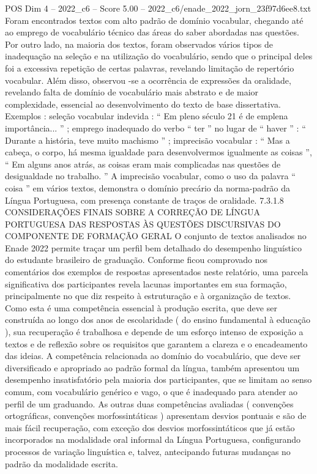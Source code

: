\begin{textsample}{POS Dim 4 – 2022\_c6 – Score 5.00 – 2022\_c6/enade\_2022\_jorn\_23f97d6ee8.txt}
Foram encontrados textos com alto padrão de domínio vocabular, chegando até ao emprego de vocabulário técnico das áreas do saber abordadas nas questões.
Por outro lado, na maioria dos textos, foram observados vários tipos de inadequação na seleção e na utilização do vocabulário, sendo que o principal deles foi a excessiva repetição de certas palavras, revelando limitação de repertório vocabular.
Além disso, observou -se a ocorrência de expressões da oralidade, revelando falta de domínio de vocabulário mais abstrato e de maior complexidade, essencial ao desenvolvimento do texto de base dissertativa.
Exemplos : seleção vocabular indevida : “ Em pleno século 21 é de emplena importância... ” ; emprego inadequado do verbo “ ter ” no lugar de “ haver ” : “ Durante a história, teve muito machismo ” ; imprecisão vocabular : “ Mas a cabeça, o corpo, há mesma igualdade para desenvolvermos igualmente as coisas ”, “ Em alguns anos atrás, as coisas eram mais complicadas nas questões de desigualdade no trabalho. ” A imprecisão vocabular, como o uso da palavra “ coisa ” em vários textos, demonstra o domínio precário da norma-padrão da Língua Portuguesa, com presença constante de traços de oralidade. 7.3.1.8 CONSIDERAÇÕES FINAIS SOBRE A CORREÇÃO DE LÍNGUA PORTUGUESA DAS RESPOSTAS ÀS QUESTÕES DISCURSIVAS DO COMPONENTE DE FORMAÇÃO GERAL O conjunto de textos analisados no Enade 2022 permite traçar um perfil bem detalhado do desempenho linguístico do estudante brasileiro de graduação.
Conforme ficou comprovado nos comentários dos exemplos de respostas apresentados neste relatório, uma parcela significativa dos participantes revela lacunas importantes em sua formação, principalmente no que diz respeito à estruturação e à organização de textos.
Como esta é uma competência essencial à produção escrita, que deve ser construída ao longo dos anos de escolaridade ( do ensino fundamental à educação ), sua recuperação é trabalhosa e depende de um esforço intenso de exposição a textos e de reflexão sobre os requisitos que garantem a clareza e o encadeamento das ideias.
A competência relacionada ao domínio do vocabulário, que deve ser diversificado e apropriado ao padrão formal da língua, também apresentou um desempenho insatisfatório pela maioria dos participantes, que se limitam ao senso comum, com vocabulário genérico e vago, o que é inadequado para atender ao perfil de um graduando.
As outras duas competências avaliadas ( convenções ortográficas, convenções morfossintáticas ) apresentam desvios pontuais e são de mais fácil recuperação, com exceção dos desvios morfossintáticos que já estão incorporados na modalidade oral informal da Língua Portuguesa, configurando processos de variação linguística e, talvez, antecipando futuras mudanças no padrão da modalidade escrita.

\end{textsample}
